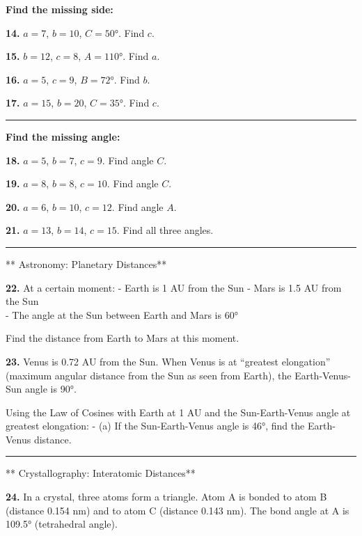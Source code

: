 \documentclass[
  11pt,
]{article}
\begin{document}
\textbf{Find the missing side:}

\textbf{14.} \(a = 7\), \(b = 10\), \(C = 50°\). Find \(c\).

\textbf{15.} \(b = 12\), \(c = 8\), \(A = 110°\). Find \(a\).

\textbf{16.} \(a = 5\), \(c = 9\), \(B = 72°\). Find \(b\).

\textbf{17.} \(a = 15\), \(b = 20\), \(C = 35°\). Find \(c\).

\begin{center}\rule{0.5\linewidth}{0.5pt}\end{center}

\textbf{Find the missing angle:}

\textbf{18.} \(a = 5\), \(b = 7\), \(c = 9\). Find angle \(C\).

\textbf{19.} \(a = 8\), \(b = 8\), \(c = 10\). Find angle \(C\).

\textbf{20.} \(a = 6\), \(b = 10\), \(c = 12\). Find angle \(A\).

\textbf{21.} \(a = 13\), \(b = 14\), \(c = 15\). Find all three angles.

\begin{center}\rule{0.5\linewidth}{0.5pt}\end{center}

** Astronomy: Planetary Distances**

\textbf{22.} At a certain moment: - Earth is 1 AU from the Sun - Mars is
1.5 AU from the Sun\\
- The angle at the Sun between Earth and Mars is 60°

Find the distance from Earth to Mars at this moment.

\textbf{23.} Venus is 0.72 AU from the Sun. When Venus is at ``greatest
elongation'' (maximum angular distance from the Sun as seen from Earth),
the Earth-Venus-Sun angle is 90°.

Using the Law of Cosines with Earth at 1 AU and the Sun-Earth-Venus
angle at greatest elongation: - (a) If the Sun-Earth-Venus angle is 46°,
find the Earth-Venus distance.

\begin{center}\rule{0.5\linewidth}{0.5pt}\end{center}

** Crystallography: Interatomic Distances**

\textbf{24.} In a crystal, three atoms form a triangle. Atom A is bonded
to atom B (distance 0.154 nm) and to atom C (distance 0.143 nm). The
bond angle at A is 109.5° (tetrahedral angle).
\end{document}
